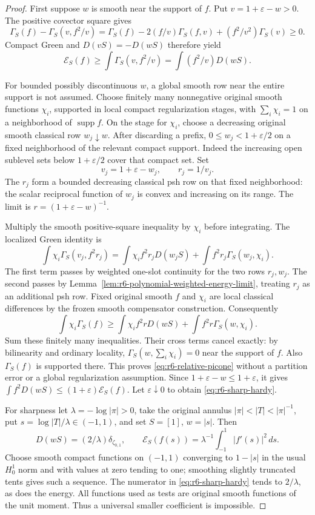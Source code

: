\documentclass[11pt,a4paper]{article}
\numberwithin{equation}{section}
\theoremstyle{definition}
\theoremstyle{remark}
\begin{document}
\begin{proof}
First suppose $w$ is smooth near the support of $f$. Put
$v=1+\varepsilon-w>0$. The positive covector square gives
\[
 \Gamma_S(f)-\Gamma_S(v,f^2/v)
  =\Gamma_S(f)-2(f/v)\Gamma_S(f,v)+(f^2/v^2)\Gamma_S(v)\ge0.
\]
Compact Green and $D(vS)=-D(wS)$ therefore yield
\[
 \mathcal E_S(f)\ge\int\Gamma_S(v,f^2/v)
                         =\int(f^2/v)D(wS).
\]

For bounded possibly discontinuous $w$, a global smooth row near the
entire support is not assumed. Choose finitely many nonnegative
original smooth functions $\chi_i$, supported in local compact
regularization stages, with $\sum_i\chi_i=1$ on a neighborhood of
$\operatorname{supp}f$. On the stage for $\chi_i$, choose a decreasing
original smooth classical row $w_j\downarrow w$. After discarding a
prefix, $0\le w_j<1+\varepsilon/2$ on a fixed neighborhood of the
relevant compact support. Indeed the increasing open sublevel sets
below $1+\varepsilon/2$ cover that compact set. Set
\[
       v_j=1+\varepsilon-w_j,\qquad r_j=1/v_j.
\]
The $r_j$ form a bounded decreasing classical psh row on that fixed
neighborhood: the scalar reciprocal function of $w_j$ is convex and
increasing on its range. The limit is $r=(1+\varepsilon-w)^{-1}$.

Multiply the smooth positive-square inequality by $\chi_i$ before
integrating. The localized Green identity is
\[
 \int\chi_i\Gamma_S(v_j,f^2r_j)
    =\int\chi_i f^2r_jD(w_jS)
                              +\int f^2r_j\Gamma_S(w_j,\chi_i).
\]
The first term passes by weighted one-slot continuity for the two rows
$r_j,w_j$. The second passes by
Lemma~\ref{lem:r6-polynomial-weighted-energy-limit}, treating $r_j$ as
an additional psh row. Fixed original smooth $f$ and $\chi_i$ are local
classical differences by the frozen smooth compensator construction.
Consequently
\[
 \int\chi_i\Gamma_S(f)
   \ge\int\chi_i f^2rD(wS)+\int f^2r\Gamma_S(w,\chi_i).
\]
Sum these finitely many inequalities. Their cross terms cancel
exactly: by bilinearity and ordinary locality,
$\Gamma_S(w,\sum_i\chi_i)=0$ near the support of $f$.
Also $\Gamma_S(f)$ is supported there. This proves
\eqref{eq:r6-relative-picone} without a partition error or a global
regularization assumption. Since $1+\varepsilon-w\le1+\varepsilon$,
it gives
$\int f^2D(wS)\le(1+\varepsilon)\mathcal E_S(f)$.
Let $\varepsilon\downarrow0$ to obtain \eqref{eq:r6-sharp-hardy}.

For sharpness let $\lambda=-\log|\pi|>0$, take the original annulus
$|\pi|<|T|<|\pi|^{-1}$, put $s=\log|T|/\lambda\in(-1,1)$,
and set $S=[1]$, $w=|s|$. Then
\[
                 D(wS)=(2/\lambda)\delta_{\zeta_{0,1}},
       \qquad \mathcal E_S(f(s))
                   =\lambda^{-1}\int_{-1}^1|f'(s)|^2\,ds.
\]
Choose smooth compact functions on $(-1,1)$ converging to
$1-|s|$ in the usual $H^1_0$ norm and with values at zero tending
to one; smoothing slightly truncated tents gives such a sequence.
The numerator in \eqref{eq:r6-sharp-hardy} tends to $2/\lambda$,
as does the energy. All functions used as tests are original smooth
functions of the unit moment. Thus a universal smaller coefficient
is impossible.
\end{proof}
\end{document}
